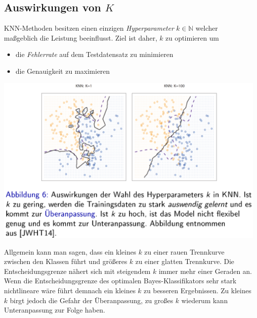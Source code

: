 \documentclass{report}
\begin{document}
\subsection{Auswirkungen von $K$}
KNN-Methoden besitzen einen einzigen \textit{Hyperparameter} $k \in \mathbb{N}$ welcher maßgeblich die Leistung beeinflusst.
Ziel ist daher, $k$ zu optimieren um\\
\vspace*{-1.5em}
\begin{itemize}
  \item die \textit{Fehlerrate} auf dem Testdatensatz zu minimieren
  \item die Genauigkeit zu maximieren
\end{itemize}

\begin{center}
  \includegraphics[scale=.35]{ml05_5}
\end{center}

Allgemein kann man sagen, dass ein kleines $k$ zu einer rauen Trennkurve zwischen den Klassen führt und größeres $k$ zu einer glatten Trennkurve.
Die Entscheidungsgrenze nähert sich mit steigendem $k$ immer mehr einer Geraden an.\\
Wenn die Entscheidungsgrenze des optimalen Bayes-Klassifikators sehr stark nichtlineare wäre führt demnach ein kleines $k$ zu besseren
Ergebnissen. Zu kleines $k$ birgt jedoch die Gefahr der Überanpassung, zu großes $k$ wiederum kann Unteranpassung zur Folge haben.
\end{document}
